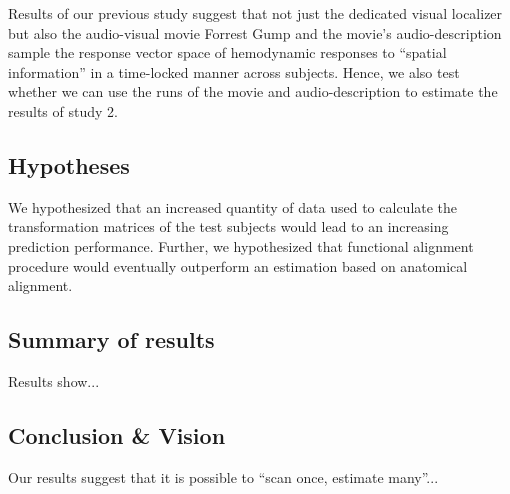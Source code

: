
%
Results of our previous study \citep{haeusler2022processing} suggest that not
just the dedicated visual localizer \citep{sengupta2016extension} but also the
audio-visual movie Forrest Gump \citep{hanke2016simultaneous} and the movie's
audio-description \citep{hanke2014audiomovie} sample the response vector space
of hemodynamic responses to ``spatial information'' in a time-locked manner
across subjects.
%
Hence, we also test whether we can use the runs of the movie and
audio-description to estimate the results of study 2.


\subsection{Hypotheses}




%
We hypothesized that an increased quantity of data used to calculate the
transformation matrices of the test subjects would lead to an increasing
prediction performance.
%
Further, we hypothesized that functional alignment procedure would eventually
outperform an estimation based on anatomical alignment.


\subsection{Summary of results}


%
Results show...


\subsection{Conclusion \& Vision}


Our results suggest that it is possible to ``scan once, estimate many''...



